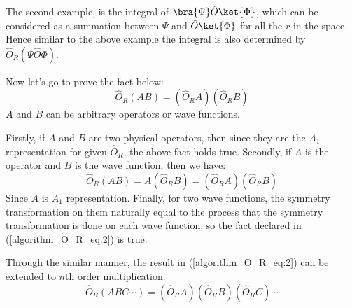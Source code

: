 The second example, is the integral of
$\bra{\Psi}\hat{O}\ket{\Phi}$, which can be considered as a summation between
$\Psi$ and $\hat{O}\ket{\Phi}$ for all the $r$ in the space. Hence similar to
the above example the integral is also determined
by $\hat{O}_{R}(\Psi\hat{O}\Phi)$.

Now let's go to prove the fact below: 
\begin{equation}
 \hat{O}_{R} (AB) =  (\hat{O}_{R} A) (\hat{O}_{R} B)
\label{algorithm_O_R_eq:2}
\end{equation}
$A$ and $B$ can be arbitrary operators or wave functions.

Firstly, if $A$ and $B$ are two physical operators, then since they are the
$A_{1}$ representation for given $\hat{O}_{R}$, the above fact holds true.
Secondly, if $A$ is the operator and $B$ is the wave function, then we have:
\begin{equation}
\hat{O}_{R} (AB) =  A (\hat{O}_{R} B) = (\hat{O}_{R} A) (\hat{O}_{R} B)
\end{equation}
Since $A$ is $A_{1}$ representation. Finally, for two wave functions, the
symmetry transformation on them naturally equal to the process that the symmetry
transformation is done on each wave function, so the fact declared in
(\ref{algorithm_O_R_eq:2}) is true.

Through the similar manner, the result in (\ref{algorithm_O_R_eq:2}) can be
extended to $n$th order multiplication:
\begin{equation}
 \hat{O}_{R} (ABC\cdots) =  (\hat{O}_{R} A) (\hat{O}_{R} B) (\hat{O}_{R} C)
\cdots
\label{algorithm_O_R_eq:3}
\end{equation}


